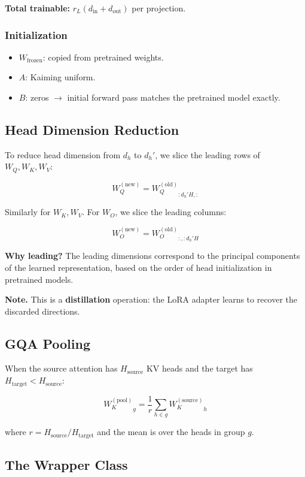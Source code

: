 \textbf{Total trainable:} $r_L (d_\text{in} + d_\text{out})$ per projection.

\subsubsection{Initialization}

\begin{itemize}
\item $W_\text{frozen}$: copied from pretrained weights.
\item $A$: Kaiming uniform.
\item $B$: zeros $\to$ initial forward pass matches the pretrained model exactly.

\end{itemize}
\subsection{Head Dimension Reduction}

To reduce head dimension from $d_h$ to $d_h'$, we slice the leading rows 
of $W_Q, W_K, W_V$:

\[
W_Q^{(\text{new})} = {W_Q^{(\text{old})}}_{:d_h' H, :}
\]

Similarly for $W_K, W_V$. For $W_O$, we slice the leading columns:

\[
W_O^{(\text{new})} = {W_O^{(\text{old})}}_{:, :d_h' H}
\]

\textbf{Why leading?} The leading dimensions correspond to the principal 
components of the learned representation, based on the order of head 
initialization in pretrained models.

\textbf{Note.} This is a \textbf{distillation} operation: the LoRA adapter learns to 
recover the discarded directions.

\subsection{GQA Pooling}

When the source attention has $H_\text{source}$ KV heads and the target has 
$H_\text{target} < H_\text{source}$:

\[
{W_K^{(\text{pool})}}_g = \frac{1}{r} \sum_{h \in g} {W_K^{(\text{source})}}_h
\]

where $r = H_\text{source} / H_\text{target}$ and the mean is over the 
heads in group $g$.

\subsection{The Wrapper Class}

